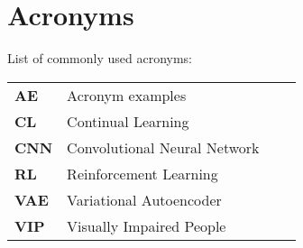 
\chapter{Acronyms}
\label{chap:acronyms}

List of commonly used acronyms: \\

\begin{tabular}{llll}
	\textbf{AE}			&	Acronym examples \\
	\textbf{CL}			& 	Continual Learning \\
	\textbf{CNN}		& 	Convolutional Neural Network \\
	\textbf{RL}			& 	Reinforcement Learning \\
	\textbf{VAE}		&	Variational Autoencoder \\
	\textbf{VIP}		&	Visually Impaired People \\
\end{tabular}